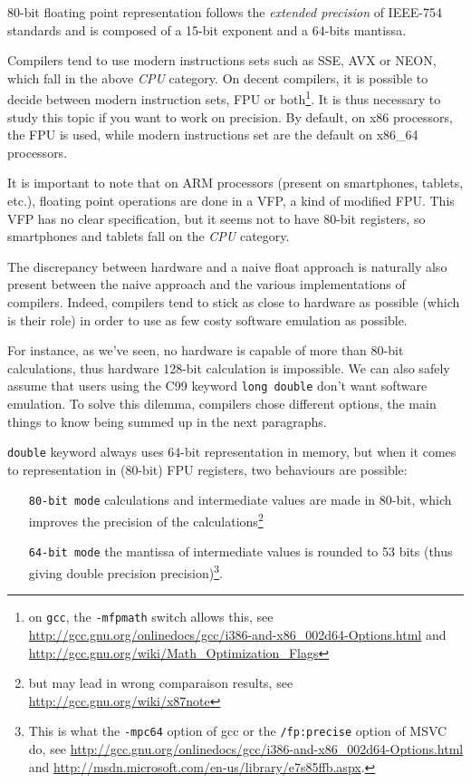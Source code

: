 80-bit floating point representation follows the \emph{extended precision} of IEEE-754 standards and is composed of a 15-bit exponent and a 64-bits mantissa.

Compilers tend to use modern instructions sets such as SSE\TODO{}, AVX\TODO{} or NEON\TODO{}, which fall in the above \emph{CPU} category. On decent compilers, it is possible to decide between modern instruction sets, FPU or both\footnote{on \texttt{gcc}, the \texttt{-mfpmath} switch allows this, see \url{http://gcc.gnu.org/onlinedocs/gcc/i386-and-x86_002d64-Options.html} and \url{http://gcc.gnu.org/wiki/Math_Optimization_Flags}}. It is thus necessary to study this topic if you want to work on precision. By default, on x86 processors, the FPU is used, while modern instructions set are the default on x86\_64 processors.

It is important to note that on ARM processors (present on smartphones, tablets, etc.), floating point operations are done in a VFP, a kind of modified FPU. This VFP has no clear specification, but it seems not to have 80-bit registers, so smartphones and tablets fall on the \emph{CPU} category.


The discrepancy between hardware and a naive float approach is naturally also present between the naive approach and the various implementations of compilers. Indeed, compilers tend to stick as close to hardware as possible (which is their role) in order to use as few costy software emulation as possible.

For instance, as we've seen, no hardware is capable of more than 80-bit calculations, thus hardware 128-bit calculation is impossible. We can also safely assume that users using the C99 keyword \texttt{long double} don't want software emulation. To solve this dilemma, compilers chose different options, the main things to know being summed up in the next paragraphs.


\let\enumstyle\texttt

\texttt{double} keyword always uses 64-bit representation in memory, but when it comes to representation in (80-bit) FPU registers, two behaviours are possible:
\begin{enumerate}
\item[\enumstyle{80-bit mode}] calculations and intermediate values are made in 80-bit, which improves the precision of the calculations\footnote{but may lead in wrong comparaison results, see \url{http://gcc.gnu.org/wiki/x87note}}
\item[\enumstyle{64-bit mode}] the mantissa of intermediate values is rounded to 53 bits (thus giving double precision precision)\footnote{This is what the \texttt{-mpc64} option of gcc or the \texttt{/fp:precise} option of MSVC do, see \url{http://gcc.gnu.org/onlinedocs/gcc/i386-and-x86\_002d64-Options.html} and \url{http://msdn.microsoft.com/en-us/library/e7s85ffb.aspx}.}.
\end{enumerate}


